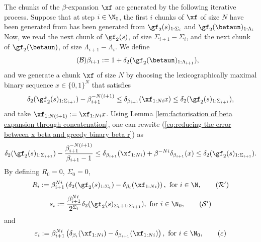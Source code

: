 The chunks of the $\beta$-expansion $\xf$ are generated by the following iterative process. Suppose that at step $i \in \N_0$, the first $i$ chunks of $\xf$ of size $N$ have been generated from has been generated from $\gf_2(s)_{1:\Sigma_i}$ and $\gf_2(\betaun)_{1:\Lambda_i}$ Now, we read the next chunk of $\gf_2(s)$, of size $\Sigma_{i+1}-\Sigma_i$, and the next chunk of $\gf_2(\betaun)$, of size $\Lambda_{i+1}-\Lambda_i$. We define 
\begin{equation}\label{eq:beta i to generate beta expansion beta r}
	\tag{\text{$\mathcal B$}}
	\beta_{i+1} := 1+\delta_2(\gf_2(\betaun)_{1:\Lambda_{i+1}}),
\end{equation}
and we generate a chunk $\xf$ of size $N$ by choosing the lexicographically maximal binary sequence $x \in \{0,1\}^N$ that satisfies 
\begin{equation}\label{eq:reducing the error between x beta and greedy binary beta r}
	\delta_2(\gf_2(s)_{1:\Sigma_{i+1}}) - \beta_{i+1}^{-N(i+1)} \leq \delta_{\beta_{i+1}}(\xf_{1:Ni}x) \leq \delta_2(\gf_2(s)_{1:\Sigma_{i+1}}),
\end{equation}
and take $\xf_{1:N(i+1)} := \xf_{1:Ni} x$. Using Lemma \ref{lem:factorisation of beta expansion through concatenation}, one can rewrite (\ref{eq:reducing the error between x beta and greedy binary beta r}) as
\begin{equation}\label{eq:first step towards x greedy exp of R i beta r}
	\delta_2(\gf_2(s)_{1:\Sigma_{i+1}}) - \frac{\beta_{i+1}^{-N(i+1)}}{\beta_{i+1} - 1} \leq \delta_{\beta_{i+1}}(\xf_{1:Ni}) + \beta^{-Ni} \delta_{\beta_{i+1}}(x) \leq \delta_2(\gf_2(s)_{1:\Sigma_{i+1}}).
\end{equation}
By defining $R_0 = 0$, $\Sigma_0 = 0$,
\begin{equation}\label{eq:R i definition beta r}
		R_i := \beta_{i+1}^{Ni}\left(\delta_2(\gf_2(s)_{1:\Sigma_{i}}) - \delta_{\beta_{i}}(\xf_{1:Ni})\right), \ \text{for} \ i \in \N,
	\tag{\text{$\mathcal{R'}$}}
\end{equation}
\begin{equation}\label{eq:s i to generate beta expansion beta r}
	s_i := \frac{\beta_{i+1}^{Ni}}{2^{\Sigma_i}}\delta_2(\gf_2(s)_{\Sigma_i+1:\Sigma_{i+1}}), \ \text{for} \ i \in \N_0,
	\tag{\text{$\mathcal{S'}$}}
\end{equation}
and
\begin{equation}\label{eq:epsilon i to generate beta expansion beta r}
	\varepsilon_i := \beta_{i+1}^{Ni} \left(\delta_{\beta_{i}}(\xf_{1:Ni}) - \delta_{\beta_{i+1}}(\xf_{1:Ni})\right), \ \text{for} \ i \in \N_0, \tag{\text{$\varepsilon$}}
\end{equation}
